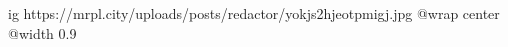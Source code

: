 
 
 
 
 

\ifcmt
  ig https://mrpl.city/uploads/posts/redactor/yokjs2hjeotpmigj.jpg
  @wrap center
  @width 0.9
\fi
